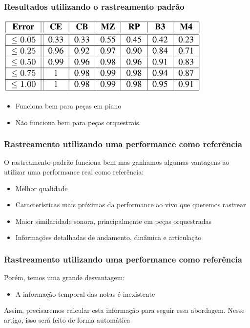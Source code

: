 \begin{frame}
  \frametitle{Resultados utilizando o rastreamento padrão}
  \begin{center}
    \includegraphics[width=0.8\textwidth]{src/img/1-Table2-1.png}
  \end{center}
  \pause
  \begin{itemize}
    \item Funciona bem para peças em piano\\\pause
    \item Não funciona bem para peças orquestrais
  \end{itemize}
\end{frame}

\begin{frame}
  \frametitle{Rastreamento utilizando uma performance como referência}
  O rastreamento padrão funciona bem mas ganhamos algumas vantagens ao utilizar uma performance real como referência:\pause
  \begin{itemize}
    \item Melhor qualidade\pause
    \item Características mais próximas da performance ao vivo que queremos rastrear\pause
    \item Maior similaridade sonora, principalmente em peças orquestradas\pause
    \item Informações detalhadas de andamento, dinâmica e articulação
  \end{itemize}
\end{frame}

\begin{frame}
  \frametitle{Rastreamento utilizando uma performance como referência}
  Porém, temos uma grande desvantagem:\pause
  \begin{itemize}
    \item A informação temporal das notas é inexistente\pause
  \end{itemize}
  Assim, precisaremos calcular esta informação para seguir essa abordagem. \pause Nesse artigo, isso será feito de forma automática
\end{frame}

